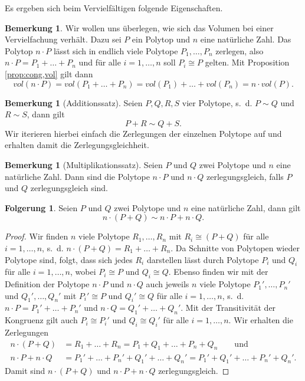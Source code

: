 \documentclass[11pt,titlepage]{article}
\theoremstyle{definition}
\newtheorem{corollary}[theorem]{Folgerung}
\newtheorem{remark}[theorem]{Bemerkung}
\theoremstyle{remark}
\begin{document}
	Es ergeben sich beim Vervielfältigen folgende Eigenschaften.
	
	\begin{remark}\label{bem:vervielf;vol}
		Wir wollen uns überlegen, wie sich das Volumen bei einer Vervielfachung 
		verhält. Dazu sei $P$ ein Polytop und $n$ eine natürliche Zahl. 
		Das Polytop $n\cdot P$ lässt sich in endlich viele Polytope 
		$P_1,\ldots,P_n$ zerlegen, also $n\cdot P=P_1+\ldots+P_n$ und für alle 
		$i=1,\ldots,n$ soll $P_i\cong P$ gelten. Mit Proposition 
		\ref{prop:cong,vol} gilt dann 
		\[vol(n\cdot P)=vol(P_1+\ldots+P_n)=vol(P_1)+\ldots+vol(P_n)=n\cdot vol(P).\]
	\end{remark}
	
	\begin{remark}[Additionssatz] \label{bem:addsatz}
		Seien $P,Q,R,S$ vier Polytope, s.~d. $P\sim Q$ und $R\sim S$, dann gilt
		\[P+R\sim Q+S.\]
		Wir iterieren hierbei einfach die Zerlegungen der einzelnen Polytope 
		auf und erhalten damit die Zerlegungsgleichheit.
	\end{remark}
	
	\begin{remark}[Multiplikationssatz] \label{bem:multsatz}
		Seien $P$ und $Q$ zwei Polytope und $n$ eine natürliche Zahl. 
		Dann sind die Polytope $n\cdot P$ und $n\cdot Q$ zerlegungsgleich, falls 
		$P$ und $Q$ zerlegungsgleich sind.
	\end{remark}
	
	\begin{corollary} \label{coroll:vervielfältigung}
		Seien $P$ und $Q$ zwei Polytope und $n$ eine natürliche Zahl, dann gilt
		\[n\cdot(P+Q)\sim n\cdot P+n\cdot Q.\]
	\end{corollary}
	
	\begin{proof}
		Wir finden $n$ viele Polytope $R_1,\ldots,R_n$ mit 
		$R_i\cong (P+Q)$ für alle $i=1,\ldots,n$, s.~d. 
		$n\cdot(P+Q)=R_1+\ldots+R_n$. Da Schnitte von Polytopen wieder 
		Polytope sind, folgt, dass sich jedes 
		$R_i$ darstellen lässt durch Polytope $P_i$ und $Q_i$ für alle 
		$i=1,\ldots,n$, wobei $P_i\cong P$ und $Q_i\cong Q$. Ebenso finden wir 
		mit der Definition der Polytope $n\cdot P$ und $n\cdot Q$ auch jeweils 
		$n$ viele Polytope 
		$P_1',\ldots,P_n'$ und $Q_1',\ldots,Q_n'$ mit $P_i'\cong P$ und 
		$Q_i'\cong Q$ für alle $i=1,\ldots,n$, s.~d. $n\cdot P=P_1'+\ldots+P_n'$ und 
		$n\cdot Q=Q_1'+\ldots+Q_n'$. Mit der Transitivität der Kongruenz 
		gilt auch $P_i\cong P_i'$ und $Q_i\cong Q_i'$ für alle 
		$i=1,\ldots,n$. Wir erhalten die Zerlegungen
		\begin{align*}
		n\cdot(P+Q)&=R_1+\ldots+R_n=P_1+Q_1+\ldots+P_n+Q_n \qquad\text{und}\\
		n\cdot P+n\cdot Q&=P_1'+\ldots+P_n'+Q_1'+\ldots+Q_n'=
		P_1'+Q_1'+\ldots+P_n'+Q_n'.
		\end{align*}
		Damit sind $n\cdot (P+Q)$ und $n\cdot P+n\cdot Q$ zerlegungsgleich.
	\end{proof}
\end{document}
